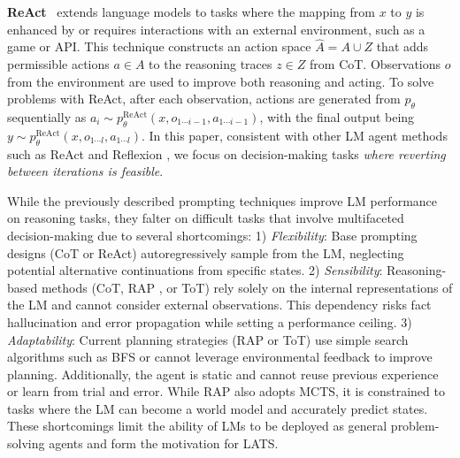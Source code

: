 \documentclass{article}
\theoremstyle{plain}
\theoremstyle{definition}
\theoremstyle{remark}
\begin{document}
\textbf{ReAct}~\citep{yao2023react} extends language models to tasks where the mapping from \( x \) to \( y \) is enhanced by or requires interactions with an external environment, such as a game or API. This technique constructs an action space $\hat{A} = A \cup Z$ that adds permissible actions $a \in A$ to the reasoning traces $z \in Z$ from CoT. Observations $o$ from the environment are used to improve both reasoning and acting. To solve problems with ReAct, after each observation, actions are generated from $p_\theta$ sequentially as \( a_i \sim p_\theta^\mathrm{ReAct}(x, o_{1\cdots i-1}, a_{1\cdots i-1}) \), with the final output being \( y \sim p_\theta^\mathrm{ReAct}(x, o_{1\cdots l}, a_{1\cdots l}) \). In this paper, consistent with other LM agent methods such as ReAct and Reflexion \cite{shinn2023reflexion}, we focus on decision-making tasks \emph{where reverting between iterations is feasible}.

While the previously described prompting techniques improve LM performance on reasoning tasks, they falter on difficult tasks that involve multifaceted decision-making due to several shortcomings: 1) \textit{Flexibility}: Base prompting designs (CoT or ReAct) autoregressively sample from the LM, neglecting potential alternative continuations from specific states. 2) \textit{Sensibility}: Reasoning-based methods (CoT, RAP \cite{hao2023reasoning}, or ToT) rely solely on the internal representations of the LM and cannot consider external observations. This dependency risks fact hallucination and error propagation while setting a performance ceiling. 3) \textit{Adaptability}: Current planning strategies (RAP or ToT) use simple search algorithms such as BFS or cannot leverage environmental feedback to improve planning. Additionally, the agent is static and cannot reuse previous experience or learn from trial and error. While RAP also adopts MCTS, it is constrained to tasks where the LM can become a world model and accurately predict states. These shortcomings limit the ability of LMs to be deployed as general problem-solving agents and form the motivation for LATS.
\end{document}
